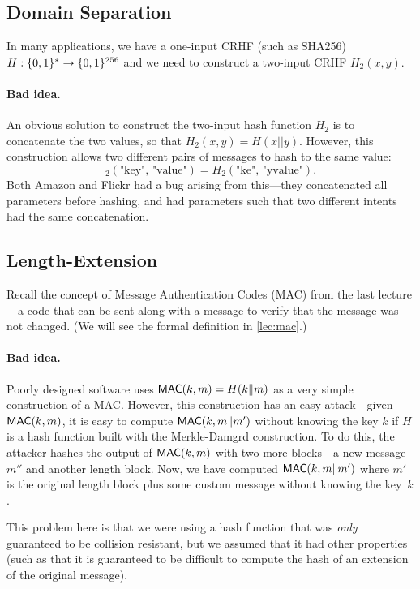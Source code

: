 \subsection{Domain Separation}
In many applications, we have a one-input CRHF (such as SHA256) $H: \{0,1\}^* \rightarrow \{0,1\}^{256}$ 
and we need to construct a two-input CRHF $H_2(x, y)$. 

\paragraph{Bad idea.} An obvious solution to construct the two-input hash function $H_2$ 
is to concatenate the two values, so that $H_2(x, y) = H(x || y)$.
However, this construction allows two different pairs of messages to hash to the same value:
\[ _2(\text{"key", "value"}) = H_2(\text{"ke", "yvalue"}).\]
Both Amazon and Flickr had a bug arising from
this---they concatenated all parameters before
hashing, and had parameters such that two
different intents had the same concatenation.\cite{flickr}

\subsection{Length-Extension}
Recall the concept of Message Authentication Codes
(MAC) from the last lecture---a code that can be
sent along with a message to verify that the message was not changed.
(We will see the formal definition in \cref{lec:mac}.)

\paragraph{Bad idea.}
Poorly designed software uses $\mathsf{MAC}(k, m) = H(k \| m)$ as a very simple construction of a MAC.
However, this construction has an easy attack---given $\mathsf{MAC}(k, m)$, it is easy to compute $\mathsf{MAC}(k, m\|m')$ 
without knowing the key $k$ if $H$ is a hash function built with the Merkle-Damg\a{}rd construction.
To do this, the attacker hashes the output of $\mathsf{MAC}(k, m)$ with two more blocks---a new 
message $m''$ and another length block. Now, we
have computed $\mathsf{MAC}(k, m\|m')$ where $m'$ is the
original length block plus some custom message
without knowing the key~$k$. 

This problem here is that we were using a hash
function that was \emph{only} guaranteed to be
collision resistant, but we assumed that it had other
properties (such as that it is guaranteed to be
difficult to compute the hash of an extension of
the original message).

